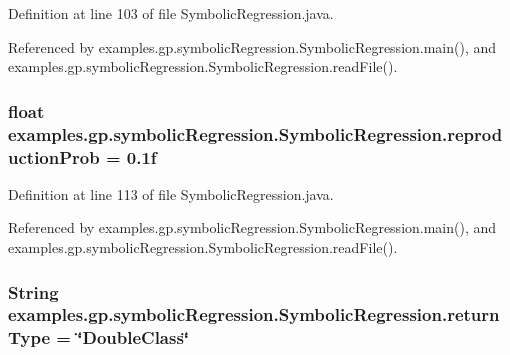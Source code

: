 Definition at line 103 of file Symbolic\-Regression.\-java.



Referenced by examples.\-gp.\-symbolic\-Regression.\-Symbolic\-Regression.\-main(), and examples.\-gp.\-symbolic\-Regression.\-Symbolic\-Regression.\-read\-File().

\hypertarget{classexamples_1_1gp_1_1symbolic_regression_1_1_symbolic_regression_ab389bebc082ad688c17471ff85d2426d}{
\subsubsection[{reproduction\-Prob}]{\setlength{\rightskip}{0pt plus 5cm}float examples.\-gp.\-symbolic\-Regression.\-Symbolic\-Regression.\-reproduction\-Prob = 0.\-1f\hspace{0.3cm}{\ttfamily [static]}}}\label{classexamples_1_1gp_1_1symbolic_regression_1_1_symbolic_regression_ab389bebc082ad688c17471ff85d2426d}


Definition at line 113 of file Symbolic\-Regression.\-java.



Referenced by examples.\-gp.\-symbolic\-Regression.\-Symbolic\-Regression.\-main(), and examples.\-gp.\-symbolic\-Regression.\-Symbolic\-Regression.\-read\-File().

\hypertarget{classexamples_1_1gp_1_1symbolic_regression_1_1_symbolic_regression_a77c395337e561c5dc584da9a3e200fc0}{
\subsubsection[{return\-Type}]{\setlength{\rightskip}{0pt plus 5cm}String examples.\-gp.\-symbolic\-Regression.\-Symbolic\-Regression.\-return\-Type = \char`\"{}Double\-Class\char`\"{}\hspace{0.3cm}{\ttfamily [static]}}}\label{classexamples_1_1gp_1_1symbolic_regression_1_1_symbolic_regression_a77c395337e561c5dc584da9a3e200fc0}


